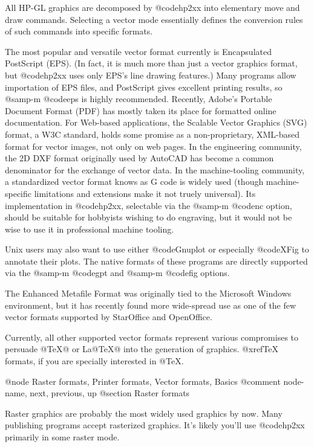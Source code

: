 All HP-GL graphics are decomposed by @code{hp2xx} into elementary
move and draw commands. Selecting a vector mode essentially defines the
conversion rules of such commands into specific formats.

The most popular and versatile vector format currently is
Encapsulated PostScript (EPS). (In fact, it is much more than just a
vector graphics format, but @code{hp2xx} uses only EPS's line drawing
features.) Many programs allow importation of EPS files, and PostScript
gives excellent printing results, so @samp{-m @code{eps}} is highly
recommended. Recently, Adobe's Portable Document Format (PDF) has mostly taken
its place for formatted online documentation. For Web-based applications,
the Scalable Vector Graphics (SVG) format, a W3C standard, holds some promise
as a non-proprietary, XML-based format for vector images, not only on web pages.
In the engineering community, the 2D DXF format originally used by AutoCAD has
become a common denominator for the exchange of vector data. In the
machine-tooling community, a standardized vector format knows as G code
is widely used (though machine-specific limitations and extensions make it
not truely universal). Its implementation in @code{hp2xx}, selectable via
the @samp{-m @code{nc}} option, should be suitable for hobbyists wishing to 
do engraving, but it would not be wise to use it in professional
machine tooling.

Unix users may also want to use either @code{Gnuplot} or especially @code{XFig}
to annotate their plots. The native formats of these programs are directly
supported via the @samp{-m @code{gpt}} and @samp{-m @code{fig}} options.

The Enhanced Metafile Format was originally tied to the Microsoft Windows
environment, but it has recently found more wide-spread use as one of the
few vector formats supported by StarOffice and OpenOffice.

Currently, all other supported vector formats represent various compromises
to persuade @TeX{}@ or La@TeX{}@ into the generation of graphics.
@xref{TeX formats}, if you are specially interested in @TeX{}.



@node Raster formats, Printer formats, Vector formats, Basics
@comment  node-name,  next,  previous,  up
@section Raster formats

Raster graphics are probably the most widely used graphics by now.
Many publishing programs accept rasterized graphics. It's likely you'll
use @code{hp2xx} primarily in some raster mode.

